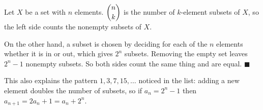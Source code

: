 Let $X$ be a set with $n$ elements. $\dbinom nk$ is the number of $k$-element subsets of $X$, so the left side counts the nonempty subsets of $X$.

On the other hand, a subset is chosen by deciding for each of the $n$ elements whether it is in or out, which gives $2^n$ subsets. Removing the empty set leaves $2^n-1$ nonempty subsets. So both sides count the same thing and are equal. $\blacksquare$

This also explains the pattern $1,3,7,15,\dots$ noticed in the list: adding a new element doubles the number of subsets, so if $a_n=2^n-1$ then $a_{n+1}=2a_n+1=a_n+2^n$.
